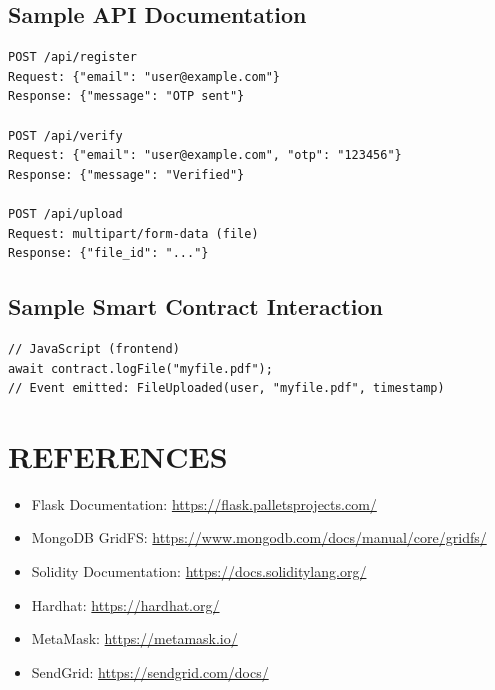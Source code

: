 \documentclass[a4paper, 12pt]{report}
\newenvironment{frontmatter}{}{}
\begin{document}
\begin{frontmatter}
\section{Sample API Documentation}
\begin{verbatim}
POST /api/register
Request: {"email": "user@example.com"}
Response: {"message": "OTP sent"}

POST /api/verify
Request: {"email": "user@example.com", "otp": "123456"}
Response: {"message": "Verified"}

POST /api/upload
Request: multipart/form-data (file)
Response: {"file_id": "..."}
\end{verbatim}

\section{Sample Smart Contract Interaction}
\begin{verbatim}
// JavaScript (frontend)
await contract.logFile("myfile.pdf");
// Event emitted: FileUploaded(user, "myfile.pdf", timestamp)
\end{verbatim}

\chapter{REFERENCES}
\begin{itemize}
  \item Flask Documentation: \url{https://flask.palletsprojects.com/}
  \item MongoDB GridFS: \url{https://www.mongodb.com/docs/manual/core/gridfs/}
  \item Solidity Documentation: \url{https://docs.soliditylang.org/}
  \item Hardhat: \url{https://hardhat.org/}
  \item MetaMask: \url{https://metamask.io/}
  \item SendGrid: \url{https://sendgrid.com/docs/}
\end{itemize}



\end{document}
